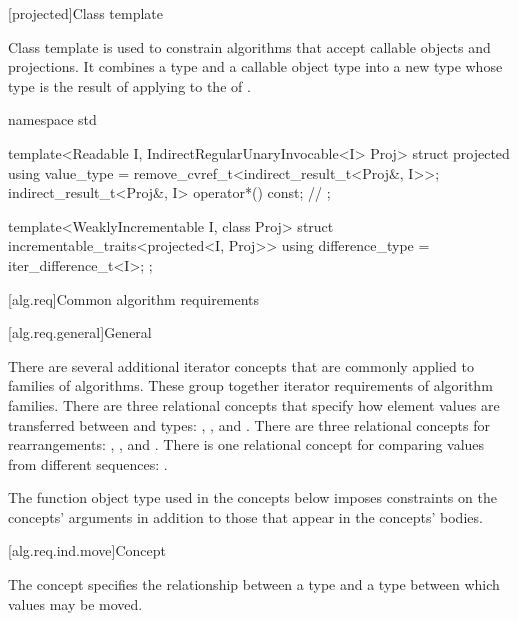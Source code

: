 [projected]{Class template }

\pnum
Class template  is used to constrain algorithms
that accept callable objects and projections.
It combines a  type  and
a callable object type  into a new  type
whose  type is the result of applying
 to the  of .

%
\begin{codeblock}
namespace std {
  template<Readable I, IndirectRegularUnaryInvocable<I> Proj>
  struct projected {
    using value_type = remove_cvref_t<indirect_result_t<Proj&, I>>;
    indirect_result_t<Proj&, I> operator*() const; // \notdef
  };

  template<WeaklyIncrementable I, class Proj>
  struct incrementable_traits<projected<I, Proj>> {
    using difference_type = iter_difference_t<I>;
  };
}
\end{codeblock}

[alg.req]{Common algorithm requirements}

[alg.req.general]{General}

\pnum
There are several additional iterator concepts that are commonly applied
to families of algorithms. These group together iterator requirements
of algorithm families.
There are three relational concepts that specify
how element values are transferred  between  and
 types:
,
, and
.
There are three relational concepts for rearrangements:
,
, and
.
There is one relational concept for comparing values from different sequences:
.

\pnum
\begin{note}
The  function object type
used in the concepts below imposes constraints on the concepts' arguments
in addition to those that appear in the concepts' bodies.
\end{note}

[alg.req.ind.move]{Concept }

\pnum
The  concept specifies the relationship between
a  type and a  type between which
values may be moved.

